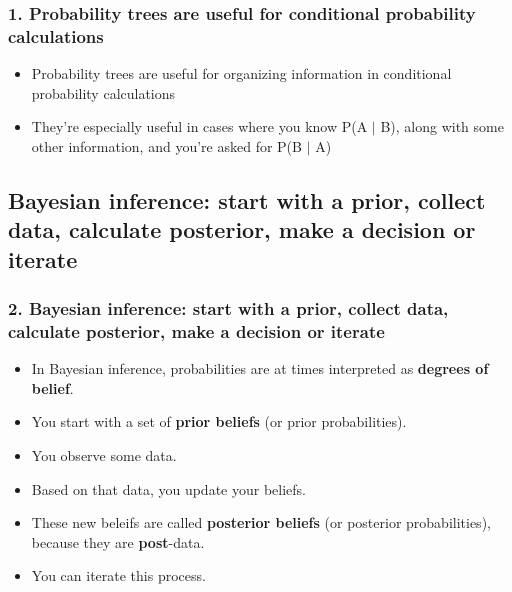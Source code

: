 \documentclass[slidestop,compress,mathserif,12pt,t,professionalfonts,xcolor=table]{beamer}
\begin{document}

\begin{frame}
\frametitle{1. Probability trees are useful for conditional probability calculations}

\begin{itemize}

\item Probability trees are useful for organizing information in conditional probability calculations

\item They're especially useful in cases where you know P(A $|$ B), along with some other information, and you're asked for P(B $|$ A)

\end{itemize}

\end{frame}


\subsection{Bayesian inference: start with a prior, collect data, calculate posterior, make a decision or iterate}
\label{mi2}


\begin{frame}
\frametitle{2. Bayesian inference: start with a prior, collect data, calculate posterior, make a decision or iterate}

\begin{itemize}[<+->]

\item In Bayesian inference, probabilities are at times interpreted as \textbf{degrees of belief}.

\item You start with a set of \textbf{prior beliefs} (or prior probabilities).

\item You observe some data.

\item Based on that data, you update your beliefs.  

\item These new beleifs are called \textbf{posterior beliefs} (or posterior probabilities), because they are \textbf{post}-data.

\item You can iterate this process.

\end{itemize}

\end{frame}
\end{document}
